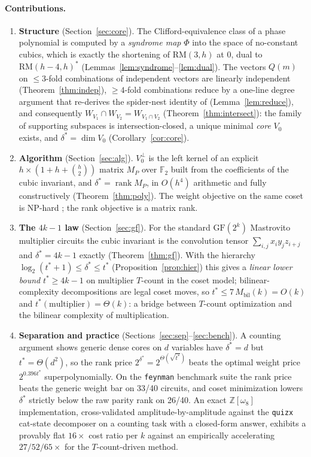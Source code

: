 \documentclass[11pt]{article}
\theoremstyle{definition}
\theoremstyle{remark}
\newcommand{\F}{\mathbb{F}_2}
\newcommand{\Z}{\mathbb{Z}}
\newcommand{\RM}{\mathrm{RM}}
\newcommand{\rank}{\operatorname{rank}}
\newcommand{\ds}{\delta^{*}}
\newcommand{\ts}{t^{*}}
\newcommand{\Mbil}{M_{\mathrm{bil}}}
\newcommand{\code}[1]{\texttt{#1}}
\begin{document}
\paragraph{Contributions.}
\begin{enumerate}[leftmargin=*]
\item \textbf{Structure} (Section~\ref{sec:core}). The Clifford-equivalence class of a phase polynomial is computed
by a \emph{syndrome map} $\Phi$ into the space of no-constant cubics, which is exactly the shortening
of $\RM(3,h)$ at $0$, dual to $\RM(h-4,h)^{*}$ (Lemmas~\ref{lem:syndrome}--\ref{lem:dual}). The vectors $Q(m)$ on $\le 3$-fold
combinations of independent vectors are linearly independent (Theorem~\ref{thm:indep}), $\ge 4$-fold
combinations reduce by a one-line degree argument that re-derives the spider-nest
identity of \cite{dBBW20} (Lemma~\ref{lem:reduce}), and consequently $W_{V_1}\cap W_{V_2}=W_{V_1\cap V_2}$ (Theorem~\ref{thm:intersect}):
the family of supporting subspaces is intersection-closed, a unique minimal \emph{core} $V_0$ exists,
and $\ds=\dim V_0$ (Corollary~\ref{cor:core}).
\item \textbf{Algorithm} (Section~\ref{sec:alg}). $V_0^{\perp}$ is the left kernel of an explicit $h\times(1+h+\binom h2)$ matrix $M_P$
over $\F$ built from the coefficients of the cubic invariant, and $\ds=\rank M_P$, in $O(h^4)$
arithmetic and fully constructively (Theorem~\ref{thm:poly}). The weight objective on the same coset
is NP-hard \cite{vdWA23}; the rank objective is a matrix rank.
\item \textbf{The $4k-1$ law} (Section~\ref{sec:gf}). For the standard $\mathrm{GF}(2^k)$ Mastrovito multiplier circuits the
cubic invariant is the convolution tensor $\sum_{i,j}x_iy_jz_{i+j}$ and $\ds=4k-1$ exactly (Theorem~\ref{thm:gf}).
With the hierarchy $\log_2(\ts+1)\le\ds\le\ts$ (Proposition~\ref{prop:hier}) this gives a \emph{linear
lower bound} $\ts\ge 4k-1$ on multiplier $T$-count in the coset model; bilinear-complexity
decompositions are legal coset moves, so $\ts\le 7\,\Mbil(k)=O(k)$ and $\ts(\text{multiplier})=\Theta(k)$:
a bridge between $T$-count optimization and the bilinear complexity of multiplication.
\item \textbf{Separation and practice} (Sections~\ref{sec:sep}--\ref{sec:bench}). A counting argument shows generic dense
cores on $d$ variables have $\ds=d$ but $\ts=\Theta(d^2)$, so the rank price $2^{\ds}=2^{\Theta(\sqrt{\ts})}$ beats
the optimal weight price $2^{0.396\ts}$ superpolynomially. On the \code{feynman} benchmark suite
the rank price beats the generic weight bar on 33/40 circuits, and coset minimization lowers
$\ds$ strictly below the raw parity rank on 26/40. An exact $\Z[\omega_8]$ implementation,
cross-validated amplitude-by-amplitude against the \code{quizx} cat-state decomposer
on a counting task with a closed-form answer, exhibits a provably flat $16\times$ cost ratio per
$k$ against an empirically accelerating $27/52/65\times$ for the $T$-count-driven method.
\end{enumerate}
\end{document}
